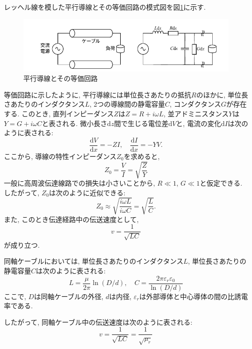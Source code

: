 \documentclass[uplatex,dvipdfmx,a4j,12pt]{jsarticle}
\newcommand{\diff}{\mathrm{d}} %
\begin{document}
レッヘル線を模した平行導線とその等価回路の模式図を図\ref{fig:lecher_line}に示す.
\begin{figure}[h]
    \centering
    \includegraphics[width=0.9\linewidth]{img/lecher_line.pdf}
    \caption{平行導線とその等価回路}
    \label{fig:lecher_line}
\end{figure}

等価回路に示したように, 平行導線には単位長さあたりの抵抗$R$のほかに, 単位長さあたりのインダクタンス$L$, 
2つの導線間の静電容量$C$, コンダクタンス$G$が存在する.
このとき, 直列インピーダンス$Z$は$Z = R + i\omega L$, 並アドミニスタンス$Y$は$Y = G + i\omega C$と表される.
微小長さ$\diff z$間で生じる電位差$\diff V$と, 電流の変化$\diff I$は次のように表される:
\begin{equation}
  \frac{\diff V}{\diff x} = - Z I, \quad \frac{\diff I}{\diff x} = - Y V.
\end{equation}
ここから, 導線の特性インピーダンス$Z_0$を求めると,
\begin{equation}
  Z_0 = \frac{V}{I} = \sqrt{\frac{Z}{Y}} 
\end{equation}
一般に高周波伝達線路での損失は小さいことから, $R \ll 1$, $G \ll 1$と仮定できる.
したがって, $Z_0$は次のように近似できる:
\begin{equation}
  Z_0 \approx \sqrt{\frac{i\omega L}{i\omega C}} = \sqrt{\frac{L}{C}}.
\end{equation}
また, このとき伝達経路中の伝送速度として,
\begin{equation}
  v = \frac{1}{\sqrt{LC}}
\end{equation}
が成り立つ.

\enskip

同軸ケーブルにおいては, 単位長さあたりのインダクタンス$L$, 単位長さあたりの静電容量$C$は次のように表される:
\begin{equation}
  L = \frac{\mu}{2\pi} \ln\left(D/d\right), \quad C = \frac{2\pi\varepsilon_r \varepsilon_0}{\ln\left(D/d\right) }
\end{equation}
ここで, $D$は同軸ケーブルの外径, $d$は内径, $\varepsilon_r$は外部導体と中心導体の間の比誘電率である.

したがって, 同軸ケーブル中の伝送速度は次のように表される:
\begin{equation}
  v = \frac{1}{\sqrt{LC}} = \frac{1}{\sqrt{\mu_r}}
\end{equation}
\end{document}
